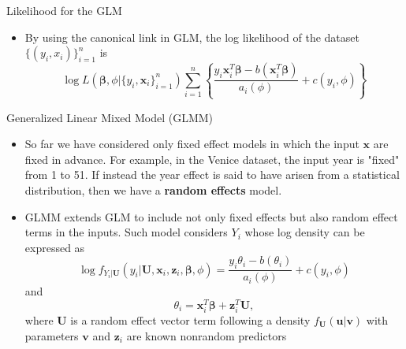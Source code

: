 \documentclass{beamer}
\begin{document}
        
        \begin{frame}{Likelihood for the GLM}
        \begin{itemize}
            \item By using the canonical link in GLM, the log likelihood of the dataset $\{(y_{i}, x_{i})\}^{n}_{i=1}$ is
            $$\log L(\boldsymbol{\beta}, \phi|\{y_{i}, \boldsymbol{x}_{i}\}^{n}_{i=1}) \sum^{n}_{i=1}\left\{\frac{y_{i}\boldsymbol{x}^{T}_{i}\boldsymbol{\beta} - b(\boldsymbol{x}^{T}_{i}\boldsymbol{\beta})}{a_{i}(\phi)} + c(y_{i}, \phi)\right\}$$
            
        \end{itemize} 
        \end{frame}
        
        \begin{frame}{Generalized Linear Mixed Model (GLMM)}
        \begin{itemize}
            \item So far we have considered only fixed effect models in which the input $\boldsymbol{x}$ are fixed in advance. For example, in the Venice dataset, the input year is "fixed" from 1 to 51. If instead the year effect is said to have arisen from a statistical distribution, then we have a {\bf random effects} model. 
            
            \item GLMM extends GLM to include not only fixed effects but also random effect terms in the inputs. Such model considers $Y_{i}$ whose log density can be expressed as
            $$\log f_{Y_{i}|\boldsymbol{U}}(y_{i}|\boldsymbol{U}, \boldsymbol{x}_{i}, \boldsymbol{z}_{i}, \boldsymbol{\beta}, \phi) = \frac{y_{i}\theta_{i} - b(\theta_{i})}{a_{i}(\phi)} + c(y_{i}, \phi)
            \label{eq: dGLMM}$$
            and
            $$\theta_{i} = \boldsymbol{x}^{T}_{i}\boldsymbol{\beta} + \boldsymbol{z}^{T}_{i}\boldsymbol{U},$$
            where $\boldsymbol{U}$ is a random effect vector term following a density $f_{\boldsymbol{U}}(\boldsymbol{u}|\boldsymbol{v})$ with parameters $\boldsymbol{v}$ and $\boldsymbol{z}_{i}$ are known nonrandom predictors

        \end{itemize} 
        \end{frame}
\end{document}
